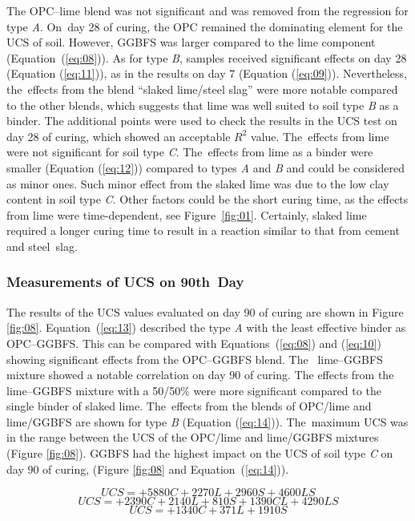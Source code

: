 \documentclass[electronics,article,accept,pdftex,moreauthors]{Definitions/mdpi}
\begin{document}
The OPC--lime blend{ }was not significant and was removed from the regression for{ }type \emph{A}. On~day 28 of curing{, the} OPC remained the dominating element for the UCS of soil. However, GGBFS was larger compared to the lime component (Equation~(\ref{eq:08})). As for type \emph{B}, samples{ }received significant effects {on day 28} (Equation (\ref{eq:11})){, as in} the {results on day 7} (Equation (\ref{eq:09})). Nevertheless, the~{effects from the blend} ``slaked lime/steel slag'' {were more notable} compared to the other blends{, which} suggests that lime was well suited to soil type \emph{B} as a binder. The{ additional }points were {used} to {check} the results in the UCS test {on day 28} of curing{, }which {showed an acceptable} $R^2$ value. The~effects from lime were not significant for soil type \emph{C}. The~{effects} from{ lime as a binder were smaller} (Equation (\ref{eq:12})) {compared} to{ }types \emph{A} and \emph{B} and could be considered as minor {ones}. Such minor effect from the slaked lime was due to the low clay content in soil type \emph{C}. Other factors could be the short curing time, as the effects from lime were time-dependent, see \mbox{{Figure} \ref{fig:01}}. Certainly, slaked lime required a longer curing time to result in a reaction similar to that from cement and steel~slag.  

\subsubsection{Measurements of UCS on 90th~Day}
The {results of the} UCS {values evaluated on day 90 of curing are shown} in {Figure} \ref{fig:08}. Equation~(\ref{eq:13}) {described the} type \emph{A} with the least effective binder{ }as OPC--GGBFS. This can be compared with Equations~(\ref{eq:08}) and (\ref{eq:10}) showing significant effects from the OPC--GGBFS blend. The~{ lime--GGBFS mixture showed a} notable correlation {on day 90 of} curing{. }The {effects from} the lime--GGBFS{ }mixture with a 50/50\%{ were more significant} compared to {the} single binder of slaked lime. The~effects from the blends of OPC/lime and lime/GGBFS are shown for{ }type \emph{B} (Equation (\ref{eq:14})). The~maximum UCS {was} in {the} range between the UCS of the OPC/lime and lime/GGBFS {mixtures} ({Figure} \ref{fig:08}). {GGBFS had the highest impact on the UCS of soil type \emph{C} on day 90 of curing}, (Figure \ref{fig:08} and Equation~(\ref{eq:14})).

\begin{equation}\label{eq:13}
﻿	UCS=+5880C+2270L+ 2960S+4600LS
\end{equation}
\begin{equation}\label{eq:14}
	﻿UCS=+2390C+2140L+810S+1390CL+4290LS
\end{equation}
\begin{equation}\label{eq:15}
﻿	UCS=+1340C+371L+1910S
\end{equation}\vspace{-15pt}
\end{document}
